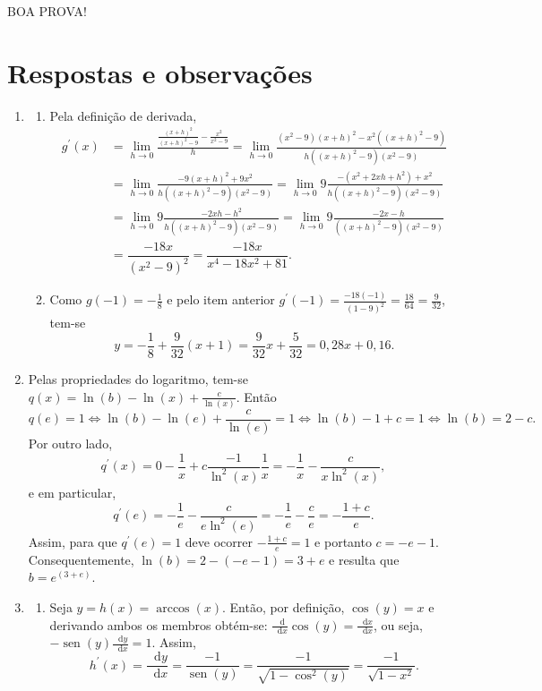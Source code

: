 \documentclass[12pt,a4paper]{article}
\newcommand*\diff{\mathop{}\!\mathrm{d}}
\newcommand*\sen{\operatorname{sen}}
\begin{document}
\begin{center}
BOA PROVA!
\end{center}

\newpage
\restoregeometry
\section*{Respostas e observações}
\begin{enumerate}
\item \begin{enumerate}
\item Pela definição de derivada,
\begin{align*}
g^\prime(x)
& = \lim_{h \to 0} \frac{\frac{(x+h)^2}{(x+h)^2 - 9} - \frac{x^2}{x^2 - 9}}{h}
= \lim_{h \to 0} \frac{(x^2 - 9) (x+h)^2 - x^2((x+h)^2 - 9)}{h ((x+h)^2 - 9)(x^2 - 9)} \\
& = \lim_{h \to 0} \frac{-9(x+h)^2 + 9x^2}{h((x+h)^2 - 9)(x^2 - 9)}
  = \lim_{h \to 0} 9 \frac{-(x^2 +2xh + h^2) + x^2}{h((x+h)^2 - 9)(x^2 - 9)} \\
& = \lim_{h \to 0} 9 \frac{-2xh -h^2}{h((x+h)^2 - 9)(x^2 - 9)}
  = \lim_{h \to 0} 9 \frac{-2x -h}{((x+h)^2 - 9)(x^2 - 9)} \\
& = \dfrac{-18x}{(x^2- 9)^2}
  = \dfrac{-18x}{x^4 - 18x^2 + 81}.
\end{align*}

\item Como $g(-1) = -\frac{1}{8}$ e pelo item anterior $g^\prime(-1) = \frac{-18(-1)}{(1-9)^2} = \frac{18}{64} = \frac{9}{32}$, tem-se
\[
y = -\frac{1}{8} + \frac{9}{32}(x + 1) = \frac{9}{32}x + \frac{5}{32} = 0,28x + 0,16.
\]
\end{enumerate}
\item Pelas propriedades do logaritmo, tem-se $q(x) = \ln(b) - \ln(x) + \frac{c}{\ln(x)}$. Então
\[
q(e) = 1
\Leftrightarrow
\ln(b) - \ln({e}) + \frac{c}{\ln(e)} = 1
\Leftrightarrow
\ln(b) - 1 + c = 1
\Leftrightarrow
\ln(b) = 2 - c.
\]
Por outro lado,
\[
q^\prime(x)
= 0 - \frac{1}{x} + c \frac{-1}{\ln^2(x)}\frac{1}{x}
= - \frac{1}{x} - \frac{c}{x \ln^2(x)},
\]
e em particular,
\[
q^\prime(e)
= - \frac{1}{e} - \frac{c}{e \ln^2(e)}
= - \frac{1}{e} - \frac{c}{e} = - \frac{1+c}{e}.
\]
Assim, para que $q^\prime(e) = 1$ deve ocorrer $- \frac{1+c}{e} = 1$  e portanto $c = -e - 1$. Consequentemente, $\ln(b) = 2-(-e-1) = 3 + e$ e resulta que $b = e^{(3+e)}$.

\item
\begin{enumerate}
\item Seja $y = h(x) = \arccos(x)$. Então, por definição, $\cos(y) = x$ e derivando ambos os membros obtém-se: $\frac{ \diff{} }{ \diff{x} } \cos(y) = \frac{ \diff{x} }{ \diff{x} }$, ou seja, $-\sen(y)\frac{ \diff{y} }{ \diff{x} }  = 1$. Assim,
\[
h^\prime(x)
= \frac{ \diff{y} }{ \diff{x} }
= \frac{-1}{ \sen(y) }
= \frac{-1}{ \sqrt{ 1- \cos^2(y) } }
= \frac{-1}{ \sqrt{ 1- x^2 } }.
\]


\end{enumerate}
\end{enumerate}
\end{document}

